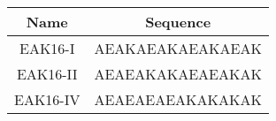 \documentclass[aps,pre,twocolumn,showpacs,preprintnumbers,amsmath,amssymb]{revtex4-1}
\begin{document}
\newpage

\begin{table}
  \centering
  \caption{}
  \begin{tabular}[t]{c|c}
    \hline
     Name & Sequence \\
    \hline
     EAK16-I  & AEAKAEAKAEAKAEAK \\
     EAK16-II & AEAEAKAKAEAEAKAK \\
     EAK16-IV & AEAEAEAEAKAKAKAK \\
    \hline
  \end{tabular}
\end{table}

\end{document}
